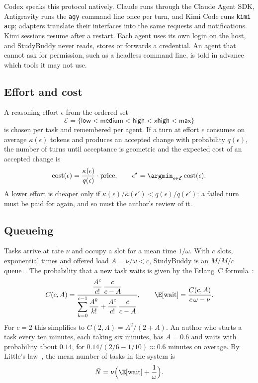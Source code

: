 Codex speaks this protocol natively. Claude runs through the Claude Agent SDK,
Antigravity runs the \texttt{agy} command line once per turn, and Kimi Code
runs \texttt{kimi acp}; adapters translate their interfaces into the same
requests and notifications. Kimi sessions resume after a restart. Each
agent uses its own login on the host, and StudyBuddy never reads, stores or
forwards a credential. An agent that cannot ask for permission, such as a
headless command line, is told in advance which tools it may not use.

\subsection{Effort and cost}

A reasoning effort $\epsilon$ from the ordered set
\begin{equation}
  \mathcal{E} = \{\textsf{low} < \textsf{medium} < \textsf{high} <
  \textsf{xhigh} < \textsf{max}\}
\end{equation}
is chosen per task and remembered per agent. If a turn at effort $\epsilon$
consumes on average $\kappa(\epsilon)$ tokens and produces an accepted change
with probability $q(\epsilon)$, the number of turns until acceptance is
geometric and the expected cost of an accepted change is
\begin{equation}
  \operatorname{cost}(\epsilon) = \frac{\kappa(\epsilon)}{q(\epsilon)}
  \cdot \operatorname{price}, \qquad
  \epsilon^{\star} = \argmin_{\epsilon \in \mathcal{E}}
    \operatorname{cost}(\epsilon).
  \label{eq:effort-cost}
\end{equation}
A lower effort is cheaper only if
$\kappa(\epsilon) / \kappa(\epsilon') < q(\epsilon) / q(\epsilon')$: a failed
turn must be paid for again, and so must the author's review of it.

\subsection{Queueing}

Tasks arrive at rate $\nu$ and occupy a slot for a mean time $1/\omega$. With
$c$ slots, exponential times and offered load $A = \nu/\omega < c$, StudyBuddy is
an $M/M/c$ queue~\cite{kleinrock1975}. The probability that a new task waits is
given by the Erlang~C formula~\cite{erlang1917}:
\begin{equation}
  C(c, A) =
  \frac{\dfrac{A^{c}}{c!}\,\dfrac{c}{c - A}}
       {\displaystyle\sum_{k=0}^{c-1} \frac{A^{k}}{k!}
        + \frac{A^{c}}{c!}\,\frac{c}{c - A}},
  \qquad
  \E[\text{wait}] = \frac{C(c, A)}{c\,\omega - \nu} .
  \label{eq:erlang}
\end{equation}
For $c = 2$ this simplifies to $C(2, A) = A^2 / (2 + A)$. An author who starts
a task every ten minutes, each taking six minutes, has $A = 0.6$ and waits
with probability about $0.14$, for $0.14 / (2/6 - 1/10) \approx 0.6$ minutes on
average. By Little's law~\cite{little1961}, the mean number of tasks in the
system is
\begin{equation}
  \bar{N} = \nu \Bigl( \E[\text{wait}] + \frac{1}{\omega} \Bigr) .
  \label{eq:little}
\end{equation}

